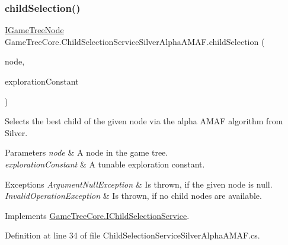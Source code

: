 \subsubsection{\texorpdfstring{child\+Selection()}{childSelection()}}
{\footnotesize\ttfamily \mbox{\hyperlink{interface_game_tree_core_1_1_i_game_tree_node}{I\+Game\+Tree\+Node}} Game\+Tree\+Core.\+Child\+Selection\+Service\+Silver\+Alpha\+A\+M\+A\+F.\+child\+Selection (\begin{DoxyParamCaption}\item[{\mbox{\hyperlink{interface_game_tree_core_1_1_i_game_tree_node}{I\+Game\+Tree\+Node}}}]{node,  }\item[{double}]{exploration\+Constant }\end{DoxyParamCaption})}



Selects the best child of the given node via the alpha A\+M\+AF algorithm from Silver. 


\begin{DoxyParams}{Parameters}
{\em node} & A node in the game tree.\\
\hline
{\em exploration\+Constant} & A tunable exploration constant.\\
\hline
\end{DoxyParams}

\begin{DoxyExceptions}{Exceptions}
{\em Argument\+Null\+Exception} & Is thrown, if the given node is null.\\
\hline
{\em Invalid\+Operation\+Exception} & Is thrown, if no child nodes are available.\\
\hline
\end{DoxyExceptions}


Implements \mbox{\hyperlink{interface_game_tree_core_1_1_i_child_selection_service}{Game\+Tree\+Core.\+I\+Child\+Selection\+Service}}.



Definition at line 34 of file Child\+Selection\+Service\+Silver\+Alpha\+A\+M\+A\+F.\+cs.

\mbox{\label{class_game_tree_core_1_1_child_selection_service_silver_alpha_a_m_a_f_a205abab62a400c3aa5bf9830047249dd}} 
